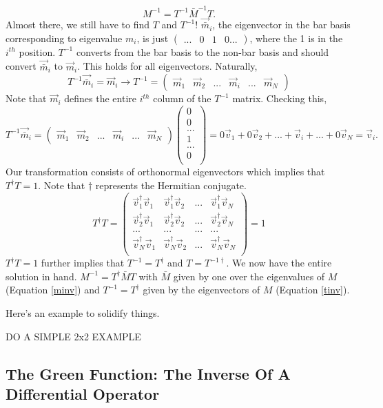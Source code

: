 \documentclass[12pt]{article}
\begin{document}
\begin{equation}
M^{-1} = T^{-1}\bar{M}^{-1}T.   
\end{equation}
Almost there, we still have to find $T$ and $T^{-1}$! $\vec{\bar{m}}_{i}$, the eigenvector in the bar basis corresponding to eigenvalue $m_i$, is just $\begin{pmatrix}... & 0 & 1 & 0 ... \end{pmatrix}$, where the 1 is in the $i^{th}$ position. $T^{-1}$ converts from the bar basis to the non-bar basis and should convert $\vec{\bar{m}}_{i}$ to $\vec{m}_{i}$. This holds for all eigenvectors. Naturally,
\begin{equation}
\label{tinv}
T^{-1}\vec{\bar{m}}_{i} = \vec{m}_{i} \rightarrow T^{-1} = 
\left( \begin{array}{c|c|c|c|c|c}
   \vec{m}_1 & \vec{m}_2 & ... & \vec{m}_i & ... & \vec{m}_N 
\end{array}\right)
\end{equation} 
Note that $\vec{m}_i$ defines the entire $i^{th}$ column of the $T^{-1}$ matrix. Checking this,
\begin{equation}
T^{-1}\vec{\bar{m}}_{i} = 
\left( \begin{array}{c|c|c|c|c|c}
   \vec{m}_1 & \vec{m}_2 & ... & \vec{m}_i & ... & \vec{m}_N 
\end{array}\right)
\begin{pmatrix}
0 \\ 0 \\ ... \\ 1 \\ ... \\ 0 \\ 
\end{pmatrix}
= 0\vec{v}_{1} + 0 \vec{v}_{2} + ... + \vec{v}_{i} + ... + 0\vec{v}_{N} = \vec{v}_{i}.
\end{equation} 
Our transformation consists of orthonormal eigenvectors which implies that $T^{\dagger}T = 1$. Note that $\dagger$ represents the Hermitian conjugate. 
\begin{equation}
T^{\dagger}T =  
\begin{pmatrix}
\vec{v}_1^\dagger \vec{v}_1 & \vec{v}_1^\dagger \vec{v}_2 & ... & \vec{v}_1^\dagger \vec{v}_N \\
\vec{v}_2^\dagger \vec{v}_1 & \vec{v}_2^\dagger \vec{v}_2 & ... & \vec{v}_2^\dagger \vec{v}_N \\
... & ... & ... & ... \\
\vec{v}_N^\dagger \vec{v}_1 & \vec{v}_N^\dagger \vec{v}_2 & ... & \vec{v}_N^\dagger \vec{v}_N \\
\end{pmatrix}
= 1
\end{equation}
$T^{\dagger}T = 1$ further implies that $T^{-1} = T^{\dagger}$ and $T = T^{-1\dagger}$. We now have the entire solution in hand. $M^{-1} = T^{\dagger}\bar{M}T$ with $\bar{M}$ given by one over the eigenvalues of $M$ (Equation \ref{minv}) and $T^{-1} = T^\dagger$ given by the eigenvectors of $M$ (Equation \ref{tinv}).

Here's an example to solidify things. 

DO A SIMPLE 2x2 EXAMPLE

\subsection{The Green Function: The Inverse Of A Differential Operator}

\end{document}
